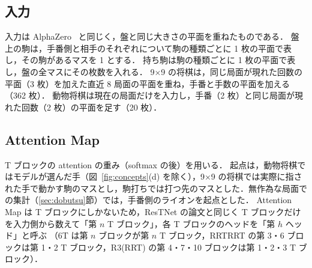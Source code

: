 \documentclass[submit]{ipsj}
\begin{document}
\subsection{入力}
\label{sec:input}
入力は AlphaZero~\cite{alphazero} と同じく，盤と同じ大きさの平面を重ねたものである．
盤上の駒は，手番側と相手のそれぞれについて駒の種類ごとに 1 枚の平面で表し，その駒があるマスを 1 とする．
持ち駒は駒の種類ごとに 1 枚の平面で表し，盤の全マスにその枚数を入れる．
9×9 の将棋は，同じ局面が現れた回数の平面（3 枚）を加えた直近 8 局面の平面を重ね，手番と手数の平面を加える（362 枚）．
動物将棋は現在の局面だけを入力し，手番（2 枚）と同じ局面が現れた回数（2 枚）の平面を足す（20 枚）．

\subsection{Attention Map}
\label{sec:attn}
T ブロックの attention の重み（softmax の後）を用いる．
起点は，動物将棋ではモデルが選んだ手（図~\ref{fig:concepts}(d) を除く），9×9 の将棋では実際に指された手で動かす駒のマスとし，駒打ちでは打つ先のマスとした．無作為な局面での集計（\ref{sec:dobutsu}節）では，手番側のライオンを起点とした．
Attention Map は T ブロックにしかないため，ResTNet の論文と同じく T ブロックだけを入力側から数えて「第 $n$ T ブロック」，各 T ブロックのヘッドを「第 $h$ ヘッド」と呼ぶ
（6T は第 $n$ ブロックが第 $n$ T ブロック，RRTRRT の第 3・6 ブロックは第 1・2 T ブロック，R3(RRT) の第 4・7・10 ブロックは第 1・2・3 T ブロック）．
\end{document}

